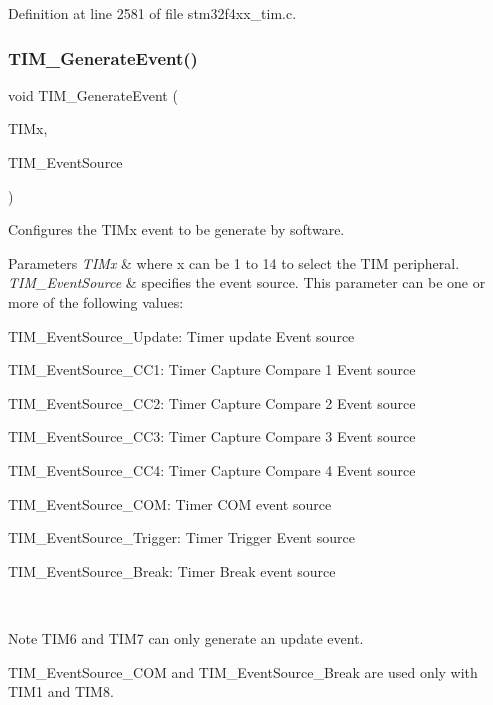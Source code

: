 Definition at line 2581 of file stm32f4xx\+\_\+tim.\+c.

\mbox{\label{group___t_i_m___group5_ga38bd4ffda920dd4f7655a0a2c6100a6e}} 
\subsubsection{\texorpdfstring{T\+I\+M\+\_\+\+Generate\+Event()}{TIM\_GenerateEvent()}}
{\footnotesize\ttfamily void T\+I\+M\+\_\+\+Generate\+Event (\begin{DoxyParamCaption}\item[{\hyperlink{struct_t_i_m___type_def}{T\+I\+M\+\_\+\+Type\+Def} $\ast$}]{T\+I\+Mx,  }\item[{uint16\+\_\+t}]{T\+I\+M\+\_\+\+Event\+Source }\end{DoxyParamCaption})}



Configures the T\+I\+Mx event to be generate by software. 


\begin{DoxyParams}{Parameters}
{\em T\+I\+Mx} & where x can be 1 to 14 to select the T\+IM peripheral. \\
\hline
{\em T\+I\+M\+\_\+\+Event\+Source} & specifies the event source. This parameter can be one or more of the following values\+: \begin{DoxyItemize}
\item T\+I\+M\+\_\+\+Event\+Source\+\_\+\+Update\+: Timer update Event source \item T\+I\+M\+\_\+\+Event\+Source\+\_\+\+C\+C1\+: Timer Capture Compare 1 Event source \item T\+I\+M\+\_\+\+Event\+Source\+\_\+\+C\+C2\+: Timer Capture Compare 2 Event source \item T\+I\+M\+\_\+\+Event\+Source\+\_\+\+C\+C3\+: Timer Capture Compare 3 Event source \item T\+I\+M\+\_\+\+Event\+Source\+\_\+\+C\+C4\+: Timer Capture Compare 4 Event source \item T\+I\+M\+\_\+\+Event\+Source\+\_\+\+C\+OM\+: Timer C\+OM event source \item T\+I\+M\+\_\+\+Event\+Source\+\_\+\+Trigger\+: Timer Trigger Event source \item T\+I\+M\+\_\+\+Event\+Source\+\_\+\+Break\+: Timer Break event source\end{DoxyItemize}
\\
\hline
\end{DoxyParams}
\begin{DoxyNote}{Note}
T\+I\+M6 and T\+I\+M7 can only generate an update event. 

T\+I\+M\+\_\+\+Event\+Source\+\_\+\+C\+OM and T\+I\+M\+\_\+\+Event\+Source\+\_\+\+Break are used only with T\+I\+M1 and T\+I\+M8.
\end{DoxyNote}

